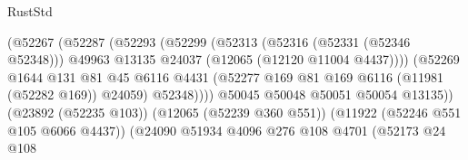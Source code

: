 \begin{lexlean}{RustStd}
\begin{coremodule}
                                                (@52267
                                                  (@52287
                                                    (@52293
                                                      (@52299
                                                        (@52313
                                                          (@52316 (@52331 (@52346 @52348)))
                                                          @49963
                                                          @13135
                                                          @24037
                                                          (@12065 (@12120 @11004 @4437))))
                                                      (@52269
                                                        @1644
                                                        @131
                                                        @81
                                                        @45
                                                        @6116
                                                        @4431
                                                        (@52277
                                                          @169
                                                          @81
                                                          @169
                                                          @6116
                                                          (@11981 (@52282 @169))
                                                          @24059)
                                                        @52348))))
                                                @50045
                                                @50048
                                                @50051
                                                @50054
                                                @13135))
                                            (@23892 (@52235 @103))
                                            (@12065 (@52239 @360 @551))
                                            (@11922 (@52246 @551 @105 @6066 @4437))
                                            (@24090
                                              @51934
                                              @4096
                                              @276
                                              @108
                                              @4701
                                              (@52173
                                                @24
                                                @108

\end{coremodule}
\end{lexlean}
